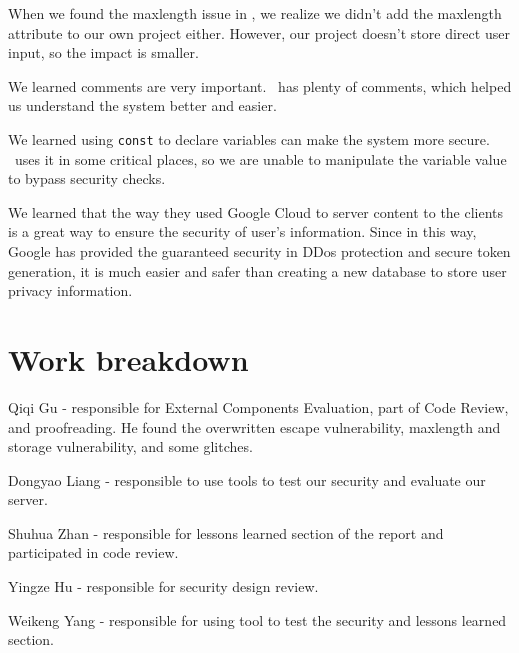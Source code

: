 \documentclass[12pt, a4paper]{article}
\newcommand{\code}[1]{\texttt{#1}}
\begin{document}
When we found the maxlength issue in \theproject, we realize we didn't add the maxlength attribute to our own project either. However, our project doesn't store direct user input, so the impact is smaller.

We learned comments are very important. \theproject\ has plenty of comments, which helped us understand the system better and easier. 

We learned using \code{const} to declare variables can make the system more secure. \theproject\ uses it in some critical places, so we are unable to manipulate the variable value to bypass security checks.

We learned that the way they used Google Cloud to server content to the clients is a great way to ensure the security of user's information. Since in this way, Google has provided the guaranteed security in DDos protection and secure token generation, it is much easier and safer than creating a new database to store user privacy information. 

\section{Work breakdown}
Qiqi Gu - responsible for External Components Evaluation, part of Code Review, and proofreading. He found the overwritten escape vulnerability, maxlength and storage vulnerability, and some glitches.

Dongyao Liang - responsible to use tools to test our security and evaluate our server.

Shuhua Zhan - responsible for lessons learned section of the report and participated in code review. 

Yingze Hu - responsible for security design review.

Weikeng Yang - responsible for using tool to test the security and lessons learned section. 





\newcommand{\citeWeb}[4][date=]{\pgfkeys{/citeWeb, #1}%
#2, \url{#3}, %
\ifx\citeWebdate\empty\else\citeWebdate, \fi%
Retrieved #4.}
\end{document}
